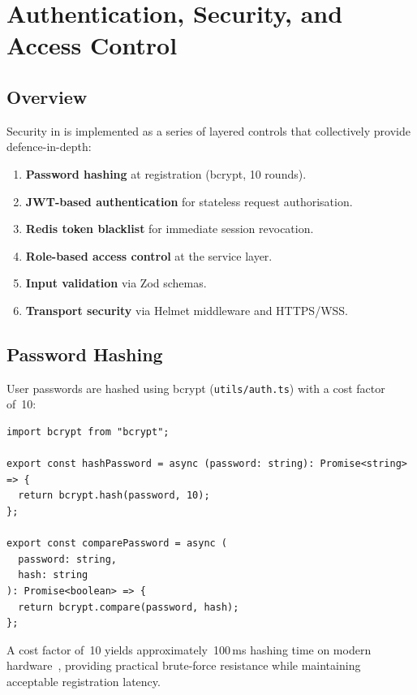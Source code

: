\section{Authentication, Security, and Access Control}
\label{sec:security}

\subsection{Overview}

Security in \echoray{} is implemented as a series of layered controls that
collectively provide defence-in-depth:

\begin{enumerate}[leftmargin=*, label=(\roman*)]
  \item \textbf{Password hashing} at registration (bcrypt, 10 rounds).
  \item \textbf{JWT-based authentication} for stateless request authorisation.
  \item \textbf{Redis token blacklist} for immediate session revocation.
  \item \textbf{Role-based access control} at the service layer.
  \item \textbf{Input validation} via Zod schemas.
  \item \textbf{Transport security} via Helmet middleware and HTTPS/WSS.
\end{enumerate}

\subsection{Password Hashing}

User passwords are hashed using bcrypt (\texttt{utils/auth.ts}) with a cost
factor of~10:

\begin{lstlisting}[caption={Password hashing and verification utilities.},
  label=lst:bcrypt]
import bcrypt from "bcrypt";

export const hashPassword = async (password: string): Promise<string> => {
  return bcrypt.hash(password, 10);
};

export const comparePassword = async (
  password: string,
  hash: string
): Promise<boolean> => {
  return bcrypt.compare(password, hash);
};
\end{lstlisting}

A cost factor of~10 yields approximately~100\,ms hashing time on modern
hardware~\cite{percival2009scrypt}, providing practical brute-force resistance
while maintaining acceptable registration latency.


